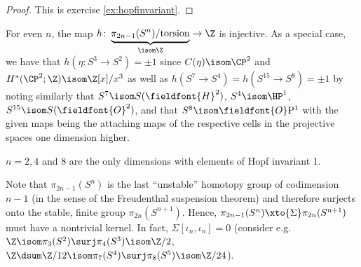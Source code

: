 \begin{proof}
	This is exercise \ref{ex:hopfinvariant}.
\end{proof}
\begin{corollary}
	For even $n$, the map $h\colon \underbrace{\pi_{2n - 1}(S^n) / \text{torsion}}_{\isom \Z} \to \Z$ is injective.
	As a special case, we have that $h(\eta\colon S^3 \to S^2) = \pm 1$ since $C(\eta) \isom \CP^2$ and $H^*(\CP^2; \Z) \isom \Z[x] / x^3$ as well as $h(S^7 \to S^4) = h(S^{15} \to S^8) = \pm 1$ by noting similarly that $S^7 \isom S(\fieldfont{H}^2)$, $S^4 \isom \HP^1$, $S^{15} \isom S(\fieldfont{O}^2)$, and that $S^8 \isom \fieldfont{O}\mathrm{P}^1$ with the given maps being the attaching maps of the respective cells in the projective spaces one dimension higher.
\end{corollary}
\begin{theorem}
	$n = 2, 4$ and 8 are the only dimensions with elements of Hopf invariant 1.
\end{theorem}
Note that $\pi_{2n - 1}(S^n)$ is the last \enquote{unstable} homotopy group of codimension $n - 1$ (in the sense of the Freudenthal suspension theorem) and therefore surjects onto the stable, finite group $\pi_{2n}(S^{n + 1})$.
Hence, $\pi_{2n - 1}(S^n) \xto{\Sigma} \pi_{2n}(S^{n + 1})$ must have a nontrivial kernel.
In fact, $\Sigma [\iota_n, \iota_n] = 0$ (consider e.g. $\Z \isom \pi_3(S^2) \surj \pi_4(S^3) \isom \Zn{2}$, $\Z \dsum \Zn{12} \isom \pi_7(S^4) \surj \pi_8(S^5) \isom \Zn{24}$).

